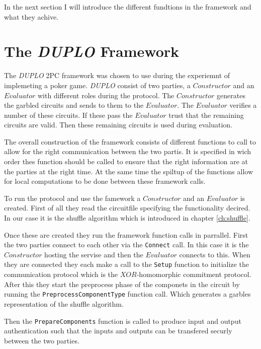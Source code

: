 \documentclass[twoside,11pt,openright]{report}
\newcommand{\DUPLO}{\textit{DUPLO} }
\begin{document}
\bigskip

In the next section I will introduce the different fundtions in the framework and what they achive.

\section{The \DUPLO Framework}
\label{sec:duplo_framework}
The \DUPLO 2PC framework was chosen to use during the experiemnt of implemeting a poker game. \DUPLO consist of two parties, a $Constructor$ and an $Evaluator$ with different roles during the protocol. The $Constructor$ generates the garbled circuits and sends to them to the $Evaluator$. The $Evaluator$ verifies a number of these circuits. If these pass the $Evaluator$ trust that the remaining circuits are valid. Then these remaining circuits is used during evaluation.

The overall construction of the framework consists of different functions to call to allow for the right communication between the two partis. It is specified in wich order thes function should be called to ensure that the right information are at the parties at the right time. At the same time the spiltup of the functions allow for local computations to be done between these framework calls.

To run the protocol and use the famework a $Constructor$ and an $Evaluator$ is created. First of all they read the circuitfile specifying the functionality decired. In our case it is the shuffle algorithm which is introduced in chapter \ref{ch:shuffle}.

Once these are created they run the framework function calls in parrallel. First the two parties connect to each other via the \verb|Connect| call. In this case it is the $Constructor$ hosting the servise and then the $Evaluator$ connects to this. When they are connected they each make a call to the \verb|Setup| function to initialize the communication protocol which is the $XOR$-homomorphic commitment protocol. After this they start the preprocess phase of the componets in the circuit by running the \verb|PreprocessComponentType| function call. Which generates a garbles representation of the shuffle algorithm.

Then the \verb|PrepareComponents| function is called to produce input and output authentication such that the inputs and outputs can be transfered securly between the two parties.
\end{document}
